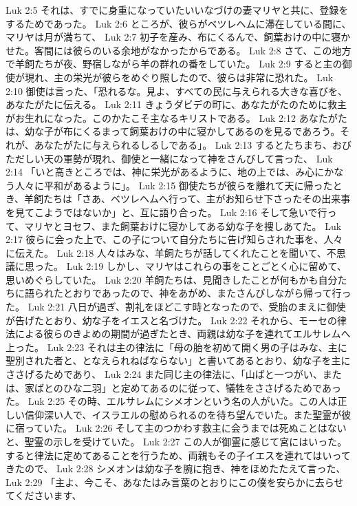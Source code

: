 Luk 2:5  それは、すでに身重になっていたいいなづけの妻マリヤと共に、登録をするためであった。
Luk 2:6  ところが、彼らがベツレヘムに滞在している間に、マリヤは月が満ちて、
Luk 2:7  初子を産み、布にくるんで、飼葉おけの中に寝かせた。客間には彼らのいる余地がなかったからである。
Luk 2:8  さて、この地方で羊飼たちが夜、野宿しながら羊の群れの番をしていた。
Luk 2:9  すると主の御使が現れ、主の栄光が彼らをめぐり照したので、彼らは非常に恐れた。
Luk 2:10  御使は言った、「恐れるな。見よ、すべての民に与えられる大きな喜びを、あなたがたに伝える。
Luk 2:11  きょうダビデの町に、あなたがたのために救主がお生れになった。このかたこそ主なるキリストである。
Luk 2:12  あなたがたは、幼な子が布にくるまって飼葉おけの中に寝かしてあるのを見るであろう。それが、あなたがたに与えられるしるしである」。
Luk 2:13  するとたちまち、おびただしい天の軍勢が現れ、御使と一緒になって神をさんびして言った、
Luk 2:14  「いと高きところでは、神に栄光があるように、地の上では、み心にかなう人々に平和があるように」。
Luk 2:15  御使たちが彼らを離れて天に帰ったとき、羊飼たちは「さあ、ベツレヘムへ行って、主がお知らせ下さったその出来事を見てこようではないか」と、互に語り合った。
Luk 2:16  そして急いで行って、マリヤとヨセフ、また飼葉おけに寝かしてある幼な子を捜しあてた。
Luk 2:17  彼らに会った上で、この子について自分たちに告げ知らされた事を、人々に伝えた。
Luk 2:18  人々はみな、羊飼たちが話してくれたことを聞いて、不思議に思った。
Luk 2:19  しかし、マリヤはこれらの事をことごとく心に留めて、思いめぐらしていた。
Luk 2:20  羊飼たちは、見聞きしたことが何もかも自分たちに語られたとおりであったので、神をあがめ、またさんびしながら帰って行った。
Luk 2:21  八日が過ぎ、割礼をほどこす時となったので、受胎のまえに御使が告げたとおり、幼な子をイエスと名づけた。
Luk 2:22  それから、モーセの律法による彼らのきよめの期間が過ぎたとき、両親は幼な子を連れてエルサレムへ上った。
Luk 2:23  それは主の律法に「母の胎を初めて開く男の子はみな、主に聖別された者と、となえられねばならない」と書いてあるとおり、幼な子を主にささげるためであり、
Luk 2:24  また同じ主の律法に、「山ばと一つがい、または、家ばとのひな二羽」と定めてあるのに従って、犠牲をささげるためであった。
Luk 2:25  その時、エルサレムにシメオンという名の人がいた。この人は正しい信仰深い人で、イスラエルの慰められるのを待ち望んでいた。また聖霊が彼に宿っていた。
Luk 2:26  そして主のつかわす救主に会うまでは死ぬことはないと、聖霊の示しを受けていた。
Luk 2:27  この人が御霊に感じて宮にはいった。すると律法に定めてあることを行うため、両親もその子イエスを連れてはいってきたので、
Luk 2:28  シメオンは幼な子を腕に抱き、神をほめたたえて言った、
Luk 2:29  「主よ、今こそ、あなたはみ言葉のとおりにこの僕を安らかに去らせてくださいます、

